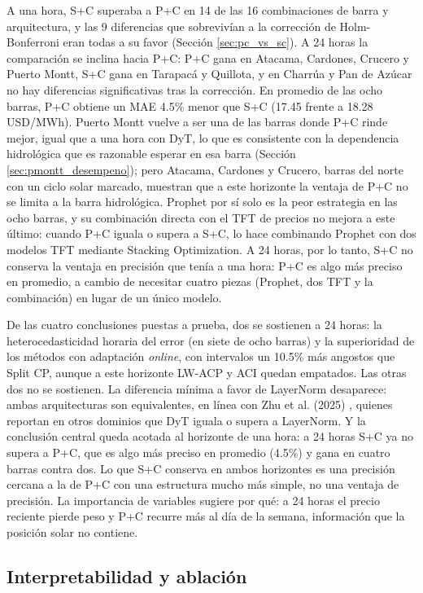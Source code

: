 A una hora, S+C superaba a P+C en 14 de las 16 combinaciones de barra y arquitectura, y las 9 diferencias que sobrevivían a la corrección de Holm-Bonferroni eran todas a su favor (Sección \ref{sec:pc_vs_sc}). A 24 horas la comparación se inclina hacia P+C: P+C gana en Atacama, Cardones, Crucero y Puerto Montt, S+C gana en Tarapacá y Quillota, y en Charrúa y Pan de Azúcar no hay diferencias significativas tras la corrección. En promedio de las ocho barras, P+C obtiene un MAE 4.5\% menor que S+C (17.45 frente a 18.28\,USD/MWh). Puerto Montt vuelve a ser una de las barras donde P+C rinde mejor, igual que a una hora con DyT, lo que es consistente con la dependencia hidrológica que es razonable esperar en esa barra (Sección \ref{sec:pmontt_desempeno}); pero Atacama, Cardones y Crucero, barras del norte con un ciclo solar marcado, muestran que a este horizonte la ventaja de P+C no se limita a la barra hidrológica. Prophet por sí solo es la peor estrategia en las ocho barras, y su combinación directa con el TFT de precios no mejora a este último: cuando P+C iguala o supera a S+C, lo hace combinando Prophet con dos modelos TFT mediante Stacking Optimization. A 24 horas, por lo tanto, S+C no conserva la ventaja en precisión que tenía a una hora: P+C es algo más preciso en promedio, a cambio de necesitar cuatro piezas (Prophet, dos TFT y la combinación) en lugar de un único modelo.

De las cuatro conclusiones puestas a prueba, dos se sostienen a 24 horas: la heterocedasticidad horaria del error (en siete de ocho barras) y la superioridad de los métodos con adaptación \textit{online}, con intervalos un 10.5\% más angostos que Split CP, aunque a este horizonte LW-ACP y ACI quedan empatados. Las otras dos no se sostienen. La diferencia mínima a favor de LayerNorm desaparece: ambas arquitecturas son equivalentes, en línea con Zhu et al. (2025) \cite{Zhu2025Transformers}, quienes reportan en otros dominios que DyT iguala o supera a LayerNorm. Y la conclusión central queda acotada al horizonte de una hora: a 24 horas S+C ya no supera a P+C, que es algo más preciso en promedio (4.5\%) y gana en cuatro barras contra dos. Lo que S+C conserva en ambos horizontes es una precisión cercana a la de P+C con una estructura mucho más simple, no una ventaja de precisión. La importancia de variables sugiere por qué: a 24 horas el precio reciente pierde peso y P+C recurre más al día de la semana, información que la posición solar no contiene.

\subsection{Interpretabilidad y ablación}
\label{sec:interpretabilidad_ablacion}

